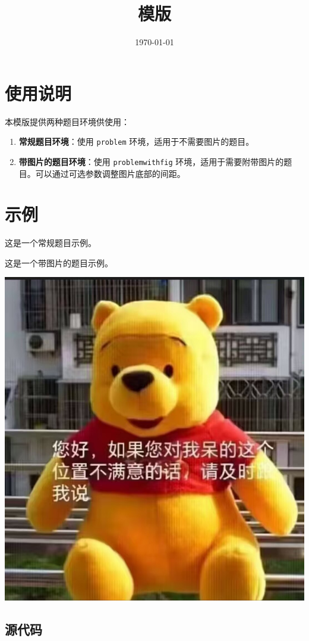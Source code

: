 \documentclass[a4paper , final]{ctexart}
\title{模版}
\date{\today}
\newenvironment{problem}[1]{%
  \item #1
  \par
  \vspace{8cm}
}{}
\newenvironment{problemwithfig}[3][2cm]{%
  \item #2
  \par\noindent
  \begin{minipage}[t][8cm][b]{\linewidth}
    \vfill
    \hfill #3
    \par\vspace{#1} %
  \end{minipage}
}{}
\begin{document}
\maketitle

\section*{使用说明}

本模版提供两种题目环境供使用：

\begin{enumerate}
  \item \textbf{常规题目环境}：使用 \texttt{problem} 环境，适用于不需要图片的题目。
  \item \textbf{带图片的题目环境}：使用 \texttt{problemwithfig} 环境，适用于需要附带图片的题目。可以通过可选参数调整图片底部的间距。
\end{enumerate}

\section*{示例}

\begin{problems}
  \begin{problem}
    {
      这是一个常规题目示例。
    }
  \end{problem}
  \newpage
  \begin{problemwithfig}[2cm] %
    {
      这是一个带图片的题目示例。
    }
    {\includegraphics[width=0.4\linewidth]{pooh.png}} %
  \end{problemwithfig}
\end{problems}

\subsection*{源代码}
\end{document}
